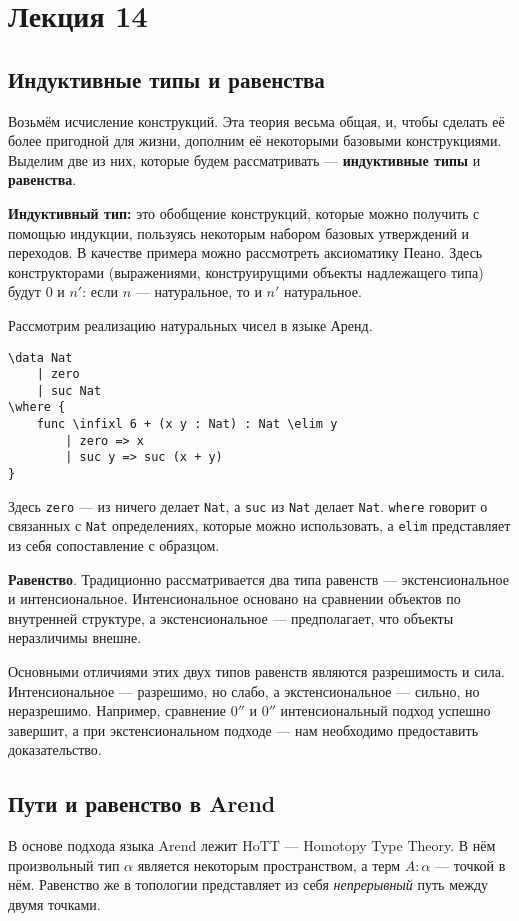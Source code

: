 \section{Лекция 14}

\newcommand{\ard}[1]{\texttt{#1}}

\subsection{Индуктивные типы и равенства}

Возьмём исчисление конструкций. Эта теория весьма общая, и, чтобы сделать её более
пригодной для жизни, дополним её некоторыми базовыми конструкциями. Выделим две из них, которые будем рассматривать
--- \textbf{индуктивные типы} и \textbf{равенства}.

\medskip
\textbf{Индуктивный тип:} это обобщение конструкций, которые можно получить с помощью индукции,
пользуясь некоторым набором базовых утверждений и переходов. В качестве примера можно рассмотреть аксиоматику Пеано.
Здесь конструкторами (выражениями, конструирущими объекты надлежащего типа) будут $0$ и $n'$: если $n$ --- натуральное, то и $n'$ натуральное.

Рассмотрим реализацию натуральных чисел в языке Аренд.
\begin{verbatim}
\data Nat
    | zero
    | suc Nat
\where {
    func \infixl 6 + (x y : Nat) : Nat \elim y
        | zero => x
        | suc y => suc (x + y)
}
\end{verbatim}

Здесь \ard{zero} --- из ничего делает \ard{Nat}, а \ard{suc} из \ard{Nat} делает \ard{Nat}.
\ard{where} говорит о связанных с \ard{Nat} определениях, которые можно использовать, а \ard{elim} представляет из себя сопоставление с образцом.

\medskip
\textbf{Равенство}. Традиционно рассматривается два типа равенств --- экстенсиональное и интенсиональное.
Интенсиональное основано на сравнении объектов по внутренней структуре, а экстенсиональное --- предполагает, что объекты неразличимы внешне.

Основными отличиями этих двух типов равенств являются разрешимость и сила. Интенсиональное --- разрешимо, но слабо, а экстенсиональное --- сильно, но неразрешимо.
Например, сравнение $0''$ и $0''$ интенсиональный подход успешно завершит, а при экстенсиональном подходе --- нам необходимо предоставить доказательство.

\subsection{Пути и равенство в Arend}
В основе подхода языка Arend лежит HoTT --- Homotopy Type Theory.
В нём произвольный тип $\alpha$ является некоторым пространством, а терм $A : \alpha$ --- точкой в нём.
Равенство же в топологии представляет из себя \textit{непрерывный} путь между двумя точками.

